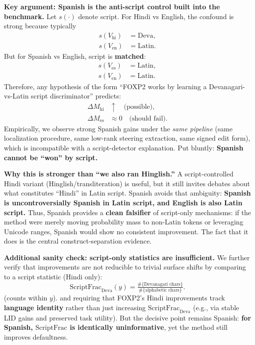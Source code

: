 \begin{itemize}[leftmargin=1.5em]
\begin{description}
\vspace{6pt}
\textbf{Key argument: Spanish is the anti-script control built into the benchmark.}
Let $s(\cdot)$ denote script. For Hindi vs English, the confound is strong because typically
\[
\begin{aligned}
s(V_{\mathrm{hi}}) &= \mathrm{Deva},\\
s(V_{\mathrm{en}}) &= \mathrm{Latin}.
\end{aligned}
\]
But for Spanish vs English, script is \textbf{matched}:
\[
\begin{aligned}
s(V_{\mathrm{es}}) &= \mathrm{Latin},\\
s(V_{\mathrm{en}}) &= \mathrm{Latin}.
\end{aligned}
\]
Therefore, any hypothesis of the form “FOXP2 works by learning a Devanagari-vs-Latin script discriminator” predicts:
\[
\begin{aligned}
\Delta M_{\mathrm{hi}} &\uparrow \quad \text{(possible)},\\
\Delta M_{\mathrm{es}} &\approx 0 \quad \text{(should fail)}.
\end{aligned}
\]
Empirically, we observe strong Spanish gains under the \emph{same pipeline} (same localization procedure, same low-rank steering extraction, same signed edit form), which is incompatible with a script-detector explanation. Put bluntly: \textbf{Spanish cannot be “won” by script.}

\vspace{6pt}
\textbf{Why this is stronger than “we also ran Hinglish.”}
A script-controlled Hindi variant (Hinglish/transliteration) is useful, but it still invites debates about what constitutes “Hindi” in Latin script. Spanish avoids that ambiguity: \textbf{Spanish is uncontroversially Spanish in Latin script, and English is also Latin script.} Thus, Spanish provides a \textbf{clean falsifier} of script-only mechanisms: if the method were merely moving probability mass to non-Latin tokens or leveraging Unicode ranges, Spanish would show no consistent improvement. The fact that it does is the central construct-separation evidence.

\vspace{6pt}
\textbf{Additional sanity check: script-only statistics are insufficient.}
We further verify that improvements are not reducible to trivial surface shifts by comparing to a script statistic (Hindi only):
\[
\mathrm{ScriptFrac}_{\mathrm{Deva}}(y)=
\tfrac{\#\{\text{Devanagari chars}\}}{\#\{\text{alphabetic chars}\}}.
\]
(counts within \(y\)).
and requiring that FOXP2’s Hindi improvements track \textbf{language identity} rather than just increasing $\mathrm{ScriptFrac}_{\mathrm{Deva}}$ (e.g., via stable LID gains and preserved task utility). But the decisive point remains Spanish: \textbf{for Spanish, $\mathrm{ScriptFrac}$ is identically uninformative}, yet the method still improves defaultness.


\end{description}
\end{itemize}
